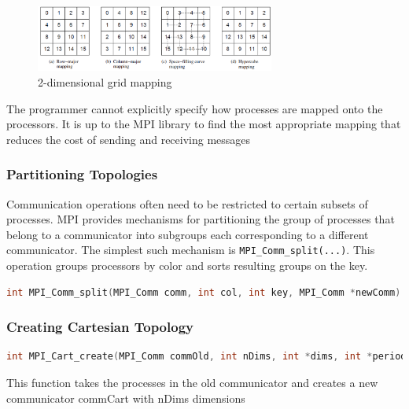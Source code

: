 \begin{figure}[H]
\centering
\includegraphics[width=0.7\textwidth]{figures/2-dimensional-mapping.png}
\caption{2-dimensional grid mapping}
\end{figure}

\begin{tcolorbox}[colback=red!5!white,colframe=red!75!black]
The programmer cannot explicitly specify how processes are mapped onto the processors. It is up to the MPI library to find the most appropriate mapping that reduces the cost of sending and receiving messages
\end{tcolorbox}

\hypertarget{partitioning-topologies}{%
\subsubsection{Partitioning Topologies}\label{partitioning-topologies}}

Communication operations often need to be restricted to certain subsets
of processes. MPI provides mechanisms for partitioning the group of
processes that belong to a communicator into subgroups each
corresponding to a different communicator. The simplest such mechanism
is \texttt{MPI\_Comm\_split(...)}. This operation groups processors by
color and sorts resulting groups on the key.

\begin{lstlisting}[language=C++]
int MPI_Comm_split(MPI_Comm comm, int col, int key, MPI_Comm *newComm)
\end{lstlisting}

\hypertarget{creating-cartesian-topology}{%
\subsubsection{Creating Cartesian
Topology}\label{creating-cartesian-topology}}

\begin{lstlisting}[language=C++]
int MPI_Cart_create(MPI_Comm commOld, int nDims, int *dims, int *periods, int reorder, MPI_Comm *commCart)
\end{lstlisting}

This function takes the processes in the old communicator and creates a
new communicator commCart with nDims dimensions


